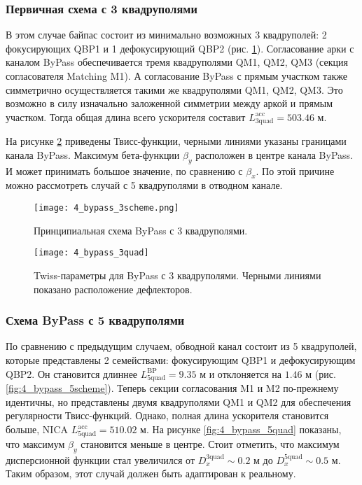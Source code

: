 \subsubsection{Первичная схема с 3 квадруполями}\label{sec:EDM/Wien_filter/ByPass/3quad}

\par В этом случае байпас состоит из минимально возможных 3 квадруполей: 2 фокусирующих QBP1 и 1 дефокусирующий QBP2 (рис. \ref{fig:4_bypass_3scheme}). Согласование арки с каналом ByPass обеспечивается тремя квадруполями QM1, QM2, QM3 (секция согласователя Matching M1). А согласование ByPass с прямым участком также симметрично осуществляется такими же квадруполями QM1, QM2, QM3. Это возможно в силу изначально заложенной симметрии между аркой и прямым участком. Тогда общая длина всего ускорителя составит $L_{\textrm{3quad}}^{\textrm{acc}}=503.46$ м.
\par На рисунке \ref{fig:4_bypass_3quad} приведены Твисс-функции, черными линиями указаны границами канала ByPass. Максимум бета-функции $\beta_y$ расположен в центре канала ByPass. И может принимать большое значение, по сравнению с $\beta_{x}$. По этой причине можно рассмотреть случай с 5 квадруполями в отводном канале.

\begin{figure}[!h]
  \centering
   \texttt{[image: 4\_bypass\_3scheme.png]}
   \caption{Принципиальная схема ByPass с 3 квадруполями.}
   \label{fig:4_bypass_3scheme}
\end{figure}

\begin{figure}[!h]
  \centering
   \texttt{[image: 4\_bypass\_3quad]}
   \caption{Twiss-параметры для ByPass с 3 квадруполями. Черными линиями показано расположение дефлекторов.}
   \label{fig:4_bypass_3quad}
\end{figure}

\subsubsection{Схема ByPass с 5 квадруполями}\label{sec:EDM/Wien_filter/ByPass/5quad}

\par По сравнению с предыдущим случаем, обводной канал состоит из 5 квадруполей, которые представлены 2 семействами: фокусирующим QBP1 и дефокусирующим QBP2. Он становится длиннее $L_{\textrm{5quad}}^{\textrm{BP}}=9.35$ м и отклоняется на $1.46$ м (рис. \ref{fig:4_bypass_5scheme}). Теперь секции согласования M1 и M2 по-прежнему идентичны, но представлены двумя квадруполями QM1 и QM2 для обеспечения регулярности Твисс-функций. Однако, полная длина ускорителя становится больше, NICA $L_{\textrm{5quad}}^{\textrm{acc}}=510.02$ м. На рисунке \ref{fig:4_bypass_5quad} показаны, что максимум $\beta_y$ становится меньше в центре. Стоит отметить, что максимум дисперсионной функции стал увеличился от $D_x^{\textrm{3quad}} \sim 0.2$ м до $D_x^{\textrm{5quad}} \sim 0.5$ м. Таким образом, этот случай должен быть адаптирован к реальному.


